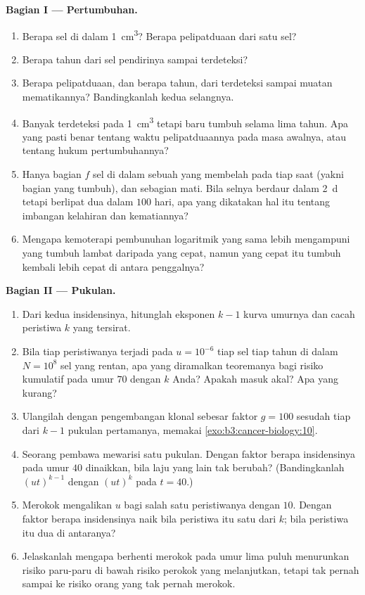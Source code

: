 \begin{problem}
\medskip
\noindent\textbf{Bagian I --- Pertumbuhan.}
\begin{enumerate}
  \item Berapa sel di dalam \qty{1}{cm^3}? Berapa pelipatduaan dari satu
        sel?
  \item Berapa tahun dari sel pendirinya sampai terdeteksi?
  \item Berapa pelipatduaan, dan berapa tahun, dari terdeteksi sampai
        muatan mematikannya? Bandingkanlah kedua selangnya.
  \item Banyak  terdeteksi pada \qty{1}{cm^3} tetapi baru tumbuh
        selama lima tahun. Apa yang pasti benar tentang waktu pelipatduaannya
        pada masa awalnya, atau tentang hukum pertumbuhannya?
  \item Hanya bagian $f$ sel di dalam sebuah  yang membelah pada tiap
        saat (yakni bagian yang tumbuh), dan sebagian mati. Bila selnya
        berdaur dalam \qty{2}{d} tetapi  berlipat dua dalam $100$
        hari, apa yang dikatakan hal itu tentang imbangan kelahiran dan
        kematiannya?
  \item Mengapa kemoterapi pembunuhan logaritmik yang sama lebih mengampuni
         yang tumbuh lambat daripada yang cepat, namun yang cepat itu
        tumbuh kembali lebih cepat di antara penggalnya?
\end{enumerate}

\medskip
\noindent\textbf{Bagian II --- Pukulan.}
\begin{enumerate}[resume]
  \item Dari kedua insidensinya, hitunglah eksponen $k - 1$ kurva
        umurnya dan cacah peristiwa $k$ yang tersirat.
  \item Bila tiap peristiwanya terjadi pada $u = 10^{-6}$ tiap sel tiap tahun
        di dalam $N = 10^{8}$ sel yang rentan, apa yang diramalkan teoremanya
        bagi risiko kumulatif pada umur $70$ dengan $k$ Anda? Apakah masuk
        akal? Apa yang kurang?
  \item Ulangilah dengan pengembangan klonal sebesar faktor $g = 100$ sesudah
        tiap dari $k - 1$ pukulan pertamanya, memakai
        \cref{exo:b3:cancer-biology:10}.
  \item Seorang pembawa mewarisi satu pukulan. Dengan faktor berapa
        insidensinya pada umur $40$ dinaikkan, bila laju yang lain tak
        berubah? (Bandingkanlah $(ut)^{k-1}$ dengan $(ut)^{k}$ pada $t = 40$.)
  \item Merokok mengalikan $u$ bagi salah satu peristiwanya dengan $10$.
        Dengan faktor berapa insidensinya naik bila peristiwa itu satu dari
        $k$; bila peristiwa itu dua di antaranya?
  \item Jelaskanlah mengapa berhenti merokok pada umur lima puluh menurunkan
        risiko  paru-paru di bawah risiko perokok yang melanjutkan,
        tetapi tak pernah sampai ke risiko orang yang tak pernah merokok.
\end{enumerate}


\end{problem}
